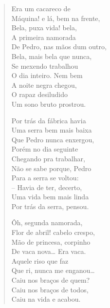 {\begin{verse}
Era um cacareco de\\
Máquina! e lá, bem na frente,\\
Bela, puxa vida! bela,\\
A primeira namorada\\
De Pedro, nas mãos dum outro,\\
Bela, mais bela que nunca,\\
Se mexendo trabalhou\\
O dia inteiro. Nem bem\\
A noite negra chegou,\\
O rapaz desiludido\\
Um sono bruto prostrou.

Por trás da fábrica havia\\
Uma serra bem mais baixa\\
Que Pedro nunca enxergou,\\
Porém no dia seguinte\\
Chegando pra trabalhar,\\
Não se sabe porque, Pedro\\
Para a serra se voltou:\\
-- Havia de ter, decerto,\\
Uma vida bem mais linda\\
Por trás da serra, pensou.

Ôh, segunda namorada,\\
Flor de abril! cabelo crespo,\\
Mão de princesa, corpinho\\
De vaca nova\ldots{} Era vaca.\\
Aquele riso que faz\\
Que ri, nunca me enganou\ldots{}\\
Caiu nos braços de quem?\\
Caiu nos braços de todos,\\
Caiu na vida e acabou.


\end{verse}}

